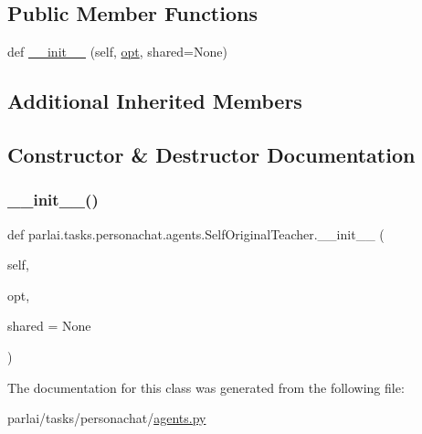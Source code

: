 \subsection*{Public Member Functions}
\begin{DoxyCompactItemize}
\item 
def \hyperlink{classparlai_1_1tasks_1_1personachat_1_1agents_1_1SelfOriginalTeacher_af64af069e88580a3365782e747637a01}{\+\_\+\+\_\+init\+\_\+\+\_\+} (self, \hyperlink{classparlai_1_1core_1_1teachers_1_1FbDialogTeacher_af7a9ec497b9cd0292d7b8fa220da7c28}{opt}, shared=None)
\end{DoxyCompactItemize}
\subsection*{Additional Inherited Members}


\subsection{Constructor \& Destructor Documentation}
\mbox{\label{classparlai_1_1tasks_1_1personachat_1_1agents_1_1SelfOriginalTeacher_af64af069e88580a3365782e747637a01}} 
\subsubsection{\texorpdfstring{\+\_\+\+\_\+init\+\_\+\+\_\+()}{\_\_init\_\_()}}
{\footnotesize\ttfamily def parlai.\+tasks.\+personachat.\+agents.\+Self\+Original\+Teacher.\+\_\+\+\_\+init\+\_\+\+\_\+ (\begin{DoxyParamCaption}\item[{}]{self,  }\item[{}]{opt,  }\item[{}]{shared = {\ttfamily None} }\end{DoxyParamCaption})}



The documentation for this class was generated from the following file\+:\begin{DoxyCompactItemize}
\item 
parlai/tasks/personachat/\hyperlink{parlai_2tasks_2personachat_2agents_8py}{agents.\+py}\end{DoxyCompactItemize}
